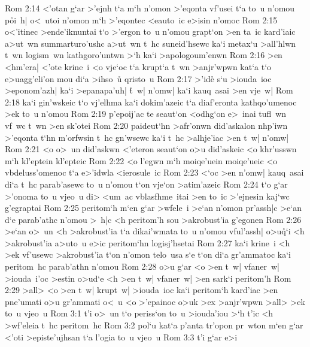 \vs Rom 2:14
<'otan
g`ar
>'ejnh
t`a
m`h
n'omon
>'eqonta
vf'usei
t`a
to~u
n'omou
p\r{o}i~h|
o<~utoi
n'omon
m`h
>'eqontec
<eauto~ic
e>isin
n'omoc\bibvsend
\vs Rom 2:15
o<'itinec
>ende'iknuntai
t`o
>'ergon
to~u
n'omou
grapt`on
>en
ta~ic
kard'iaic
a>ut~wn
summarturo'ushc
a>ut~wn
t~hc
suneid'hsewc
ka`i
metax`u
>all'hlwn
t~wn
logism~wn
kathgoro'untwn
>`h
ka`i
>apologoum'enwn\bibvsend
\vs Rom 2:16
>en
<hm'era|
<'ote
krine~i
<o
vje`oc
t`a
krupt`a
t~wn
>anjr'wpwn
kat`a
t`o
e>uagg'eli'on
mou
di`a
>ihso~u\r{}
qristo~u\bibvsend
\vs Rom 2:17
>'id\r{e}
s`u
>iouda~ioc
>eponom'azh|
ka`i
>epanapa'uh|
\r{t}~w|
n'omw|
ka`i
kauq~asai
>en
vje~w|\bibvsend
\vs Rom 2:18
ka`i
gin'wskeic
t`o
vj'elhma
ka`i
dokim'azeic
t`a
diaf'eronta
kathqo'umenoc
>ek
to~u
n'omou\bibvsend
\vs Rom 2:19
p'epoij'ac
te
seaut`on
<odhg`on
e>~inai
tufl~wn
vf~wc
t~wn
>en
sk'otei\bibvsend
\vs Rom 2:20
paideut`hn
>afr'onwn
did'askalon
nhp'iwn
>'eqonta
t`hn
m'orfwsin
t~hc
gn'wsewc
ka`i
t~hc
>alhje'iac
>en
t~w|
n'omw|\bibvsend
\vs Rom 2:21
<o
o>~un
did'askwn
<'eteron
seaut`on
o>u
did'askeic
<o
khr'usswn
m`h
kl'eptein
kl'epteic\bibvsend
\vs Rom 2:22
<o
l'egwn
m`h
moiqe'uein
moiqe'ueic
<o
vbdeluss'omenoc
t`a
e>'idwla
<ierosule~ic\bibvsend
\vs Rom 2:23
<`oc
>en
n'omw|
kauq~asai
di`a
t~hc
parab'asewc
to~u
n'omou
t`on
vje`on
>atim'azeic\bibvsend
\vs Rom 2:24
t`o
g`ar
>'onoma
to~u
vjeo~u
di>
<um~ac
vblasfhme~itai
>en
to~ic
>'ejnesin
kaj`wc
g'egraptai\bibvsend
\vs Rom 2:25
peritom`h
m`en
g`ar
>wfele~i
>e`an
n'omon
pr'assh|c
>e`an
d`e
parab'athc
n'omou
>~h|c
<h
peritom'h
sou
>akrobust'ia
g'egonen\bibvsend
\vs Rom 2:26
>e`an
o>~un
<h
>akrobust'ia
t`a
dikai'wmata
to~u
n'omou
vful'assh|
o>u\r{q}`i
<h
>akrobust'ia
a>uto~u
e>ic
peritom`hn
logisj'hsetai\bibvsend
\vs Rom 2:27
ka`i
krine~i
<h
>ek
vf'usewc
>akrobust'ia
t`on
n'omon
telo~usa
s`e
t`on
di`a
gr'ammatoc
ka`i
peritom~hc
parab'athn
n'omou\bibvsend
\vs Rom 2:28
o>u
g`ar
<o
>en
t~w|
vfaner~w|
>iouda~i'oc
>estin
o>ud`e
<h
>en
t~w|
vfaner~w|
>en
sark`i
peritom'h\bibvsend
\vs Rom 2:29
>all>
<o
>en
t~w|
krupt~w|
>iouda~ioc
ka`i
peritom`h
kard'iac
>en
pne'umati
o>u
gr'ammati
o<~u
<o
>'epainoc
o>uk
>ex
>anjr'wpwn
>all>
>ek
to~u
vjeo~u\bibvsend
\vs Rom 3:1
t'i
o>~un
t`o
periss`on
to~u
>iouda'iou
>`h
t'ic
<h
>wf'eleia
t~hc
peritom~hc\bibvsend
\vs Rom 3:2
pol`u
kat`a
p'anta
tr'opon
pr~wton
m`en
g`ar
<'oti
>episte'ujhsan
t`a
l'ogia
to~u
vjeo~u\bibvsend
\vs Rom 3:3
t'i
g`ar
e>i
